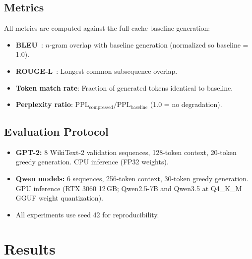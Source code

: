 \documentclass[11pt]{article}
\begin{document}
\subsection{Metrics}

All metrics are computed against the full-cache baseline generation:
\begin{itemize}[leftmargin=*]
    \item \textbf{BLEU}~\citep{papineni2002bleu}: $n$-gram overlap with baseline generation (normalized so baseline = 1.0).
    \item \textbf{ROUGE-L}~\citep{lin2004rouge}: Longest common subsequence overlap.
    \item \textbf{Token match rate}: Fraction of generated tokens identical to baseline.
    \item \textbf{Perplexity ratio}: $\text{PPL}_{\text{compressed}} / \text{PPL}_{\text{baseline}}$ (1.0 = no degradation).
\end{itemize}

\subsection{Evaluation Protocol}

\begin{itemize}[leftmargin=*]
    \item \textbf{GPT-2:} 8 WikiText-2 validation sequences, 128-token context, 20-token greedy generation.  CPU inference (FP32 weights).
    \item \textbf{Qwen models:} 6 sequences, 256-token context, 30-token greedy generation.  GPU inference (RTX 3060 12\,GB; Qwen2.5-7B and Qwen3.5 at Q4\_K\_M GGUF weight quantization).
    \item All experiments use seed 42 for reproducibility.
\end{itemize}

\section{Results}
\label{sec:results}
\end{document}
